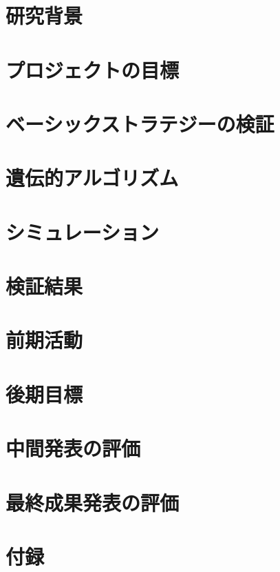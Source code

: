 \documentclass[11pt,a4paper,oneside]{jsbook}
\begin{document}
\tableofcontents
\newpage


\chapter{研究背景}





\chapter{プロジェクトの目標}

\chapter{ベーシックストラテジーの検証}

\chapter{遺伝的アルゴリズム}

\chapter{シミュレーション}


\chapter{検証結果}



\chapter{前期活動}

\chapter{後期目標}

\chapter{中間発表の評価}

\chapter{最終成果発表の評価}




\chapter{付録}


%
%
%
\end{document}
